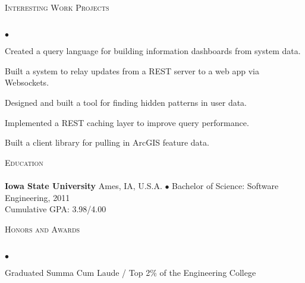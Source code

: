 \documentclass{article}
\newcommand{\lineunder} {
	\vspace*{-8pt} \\ \hspace*{-18pt} \hrulefill \\
}
\newcommand{\header}[1] {
	{\hspace*{-15pt}\vspace*{6pt} \textsc{#1}} \vspace*{-6pt} \lineunder
}
\newenvironment{achievements} {
	\begin{list}{$\bullet$}
		{\topsep 0pt \itemsep -2pt}
	}{
		\vspace*{4pt}\end{list}
	}
\newcommand{\school}[4] {
	\textbf{#1} #2 $\bullet$ #3\\
	\hspace*{15pt}#4 \\
	\vspace*{5pt}
}
\begin{document}
\header{Interesting Work Projects}

	\begin{achievements}
      \item{Created a query language for building information dashboards from system data.}
      \item{Built a system to relay updates from a REST server to a web app via Websockets.}
      \item{Designed and built a tool for finding hidden patterns in user data.}
      \item{Implemented a REST caching layer to improve query performance.}
      \item{Built a client library for pulling in ArcGIS feature data.}
   \end{achievements}

\header{Education}

	\school{Iowa State University}{Ames, IA, U.S.A.}{Bachelor of Science: Software Engineering, 2011}
	{Cumulative GPA: 3.98/4.00}

\header{Honors and Awards}

	\begin{achievements}
		\item{Graduated Summa Cum Laude / Top 2\% of the Engineering College}
	\end{achievements}
\end{document}
